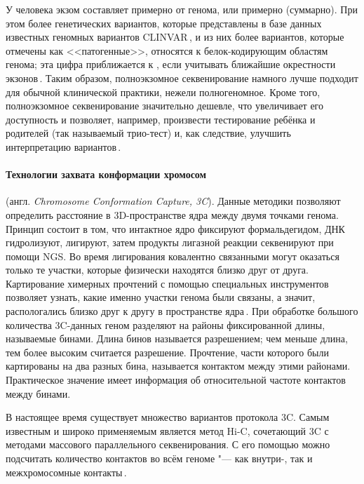 \documentclass[a4paper,14pt]{extarticle}
\newcommand{\engterm}[1]{англ. \textenglish{\textit{#1}}}
\begin{document}
У человека экзом составляет примерно  от генома, или примерно  (суммарно).
При этом более  генетических вариантов, которые представлены в базе данных известных геномных вариантов CLINVAR\,\citep{Landrum_2017}, и из них более  вариантов, которые отмечены как <<патогенные>>, относятся к белок-кодирующим областям генома;
эта цифра приближается к , если учитывать ближайшие окрестности экзонов\,\citep{Barbitoff_2020}.
Таким образом, полноэкзомное секвенирование намного лучше подходит для обычной клинической практики, нежели полногеномное.
Кроме того, полноэкзомное секвенирование значительно дешевле, что увеличивает его доступность и позволяет, например, произвести тестирование ребёнка и родителей (так называемый трио-тест) и, как следствие, улучшить интерпретацию вариантов\,\citep{Yohe_2017}.

\paragraph{Технологии захвата конформации хромосом} (\engterm{Chromosome Conformation Capture, 3C}).
Данные методики позволяют определить расстояние в 3D-пространстве ядра между двумя точками генома.
Принцип состоит в том, что интактное ядро фиксируют формальдегидом, ДНК гидролизуют, лигируют, затем продукты лигазной реакции секвенируют при помощи NGS.
Во время лигирования ковалентно связанными могут оказаться только те участки, которые физически находятся близко друг от друга.
Картирование химерных прочтений с помощью специальных инструментов позволяет узнать, какие именно участки генома были связаны, а значит, распологались близко друг к другу в пространстве ядра\,\citep{Lieberman_Aiden_2009}.
При обработке большого количества 3C-данных геном разделяют на районы фиксированной длины, называемые бинами.
Длина бинов называется разрешением; чем меньше длина, тем более высоким считается разрешение.
Прочтение, части которого были картированы на два разных бина, называется контактом между этими районами.
Практическое значение имеет информация об относительной частоте контактов между бинами.

В настоящее время существует множество вариантов протокола 3C.
Самым известным и широко применяемым является метод Hi-C, сочетающий 3C с методами массового параллельного секвенирования.
С его помощью можно подсчитать количество контактов во всём геноме "--- как внутри-, так и межхромосомные контакты\,\citep{Oluwadare_2019}.

~
\end{document}

